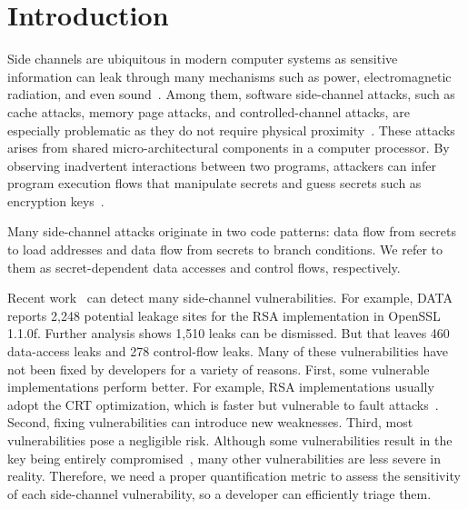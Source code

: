 \section{Introduction} 
Side channels are ubiquitous in modern computer systems as sensitive
information can leak through many mechanisms such as power,
electromagnetic radiation, and even
sound~\cite{agrawal2002side,kar20178,chari1999towards,217605,genkin2014rsa}.
Among them, software side-channel attacks, such as cache attacks, memory page
attacks, and controlled-channel attacks, are especially problematic as they do not require physical proximity~\cite{7163052,217543,217589,lee2017inferring,191010,liu2015last}. These
attacks arises from shared micro-architectural components in a computer processor.
By observing inadvertent interactions between two programs, attackers can infer program
execution flows that manipulate secrets and guess secrets such as encryption
keys~\cite{Osvik2006,Gullasch:2011:CGB:2006077.2006784,203878,10.1007/978-3-540-45238-6_6}.


Many side-channel attacks originate
in two code patterns: data flow from secrets to load
addresses and data flow from secrets to branch conditions. We refer to them as
secret-dependent data accesses and control flows, respectively. 

Recent work~\cite{203878,217537,Wichelmann:2018:MFF:3274694.3274741,Brotzman19Casym,236338,182946}
can detect many side-channel vulnerabilities. For example,
DATA~\cite{217537} reports 2,248 potential leakage sites for the RSA
implementation in OpenSSL 1.1.0f\@. 
Further analysis shows 1,510 leaks can be dismissed. But that
leaves 460 data-access leaks and 278 control-flow leaks. 
Many of these vulnerabilities have not been fixed by developers for a variety of reasons.
First, some vulnerable implementations perform better. For example,
RSA implementations usually adopt the CRT optimization,
which is faster but vulnerable to fault attacks~\cite{aumuller2002fault}.
Second, fixing vulnerabilities can introduce new 
weaknesses.
Third, most vulnerabilities pose a negligible risk. 
Although some vulnerabilities result in the key being 
entirely compromised~\cite{184415, aumuller2002fault}, 
many other vulnerabilities are less
severe in reality. Therefore, we need a proper quantification metric to 
assess the sensitivity of each side-channel vulnerability,
so a developer can efficiently triage them.

